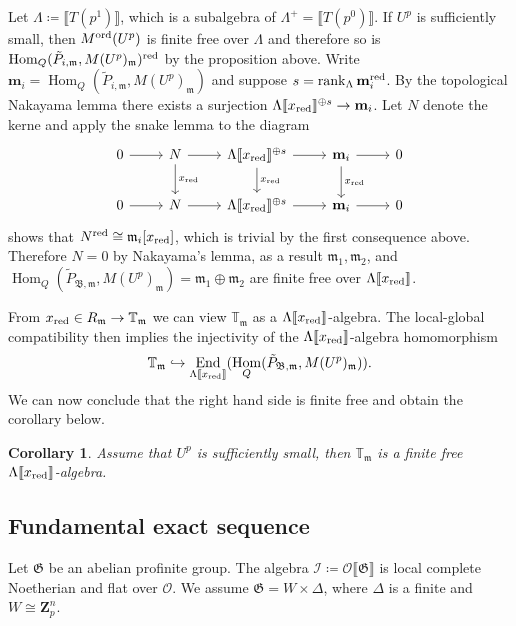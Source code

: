 \documentclass[leqno]{amsart}
\newtheorem{cor}[thm]{Corollary}
\theoremstyle{definition}
\theoremstyle{remark}
\newcommand{\oo}{\mathcal{O}}
\newcommand{\Zp}{\mathbf{Z}_p}
\DeclareMathOperator{\End}{End}
\DeclareMathOperator{\Hom}{Hom}
\DeclareMathOperator{\rank}{rank}
\newcommand{\fm}{\mathfrak{m}}
\newcommand{\B}{\mathfrak B} %
\newcommand{\red}{\textnormal{red}}
\newcommand{\xx}{x_\textnormal{red}}
\newcommand{\fG}{\mathfrak{G}}
\newcommand{\TT}{\mathbb{T}} %
\newcommand{\I}{\mathcal{I}} %
\newcommand{\ord}{\textnormal{ord}} %
\begin{document}
Let $\Lambda\coloneqq\llbracket T(p^1)\rrbracket$,
which is a subalgebra of $\Lambda^+=\llbracket T(p^0)\rrbracket$.
If $U^p$ is sufficiently small, then 
$M^{\ord}(U^p)$ is finite free over $\Lambda$ and therefore
so is $\Hom_{Q}(\tilde{P}_{i,\fm},M(U^p)_{\fm})^\red$ by the proposition above.
Write $\mathbf{m}_i=\Hom_{Q}(\tilde{P}_{i,\fm},M(U^p)_{\fm})$
and suppose $s=\rank_{\Lambda}\mathbf{m}_i^\red$.
By the topological Nakayama lemma there exists a surjection
$\Lambda\llbracket \xx\rrbracket^{\oplus s}\to\mathbf{m}_i$.
Let $N$ denote the kerne and apply the snake lemma to the diagram
\[
\begin{tikzcd}
0\arrow[r]& 
N\arrow[r]\arrow[d,"\xx"]&
\Lambda\llbracket \xx\rrbracket^{\oplus s}\arrow[r]\arrow[d,"\xx"]&
\mathbf{m}_i\arrow[r]\arrow[d,"\xx"] &0\\
0\arrow[r]& 
N\arrow[r]&
\Lambda\llbracket \xx\rrbracket^{\oplus s}\arrow[r]&
\mathbf{m}_i\arrow[r] &0
\end{tikzcd}
\]
shows that $N^\red\cong\fm_i[\xx]$, which is trivial
by the first consequence above.
Therefore $N=0$ by Nakayama's lemma, as a result
$\fm_1,\fm_2$, and
$\Hom_{Q}(\tilde{P}_{\B,\fm}, M(U^p)_\fm)=\fm_1\oplus \fm_2$
are finite free over $\Lambda\llbracket \xx\rrbracket$.


From $\xx\in R_\fm\to \TT_\fm$ we can view $\TT_{\fm}$
as a $\Lambda\llbracket \xx\rrbracket$-algebra.
The local-global compatibility then implies the injectivity of
the $\Lambda\llbracket\xx\rrbracket$-algebra homomorphism
\[
    \TT_\fm\hookrightarrow
    \End_{\Lambda\llbracket\xx\rrbracket}
    (\Hom_{Q}(\tilde{P}_{\B,\fm},M(U^p)_{\fm})).
\]
We can now conclude that the right hand side is finite free
and obtain the corollary below.


\begin{cor}\label{cor:Hecke_ff}
Assume that $U^p$ is sufficiently small,
then $\TT_\fm$ is a finite free 
$\Lambda\llbracket\xx\rrbracket$-algebra.
\end{cor}



\subsection{Fundamental exact sequence}


Let $\fG$ be an abelian profinite group.
The algebra $\I\coloneqq\oo\llbracket\fG\rrbracket$
is local complete Noetherian and flat over $\oo$.
We assume $\fG=W\times \Delta$,
where $\Delta$ is a finite and $W\cong\Zp^n$.
\end{document}
